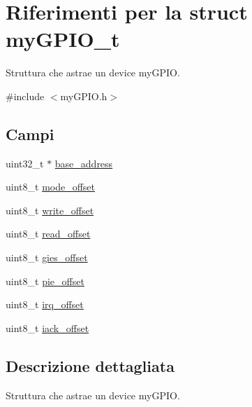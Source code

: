 \hypertarget{structmy_g_p_i_o__t}{}\section{Riferimenti per la struct my\+G\+P\+I\+O\+\_\+t}
\label{structmy_g_p_i_o__t}


Struttura che astrae un device my\+G\+P\+IO.  




{\ttfamily \#include $<$my\+G\+P\+I\+O.\+h$>$}

\subsection*{Campi}
\begin{DoxyCompactItemize}
\item 
uint32\+\_\+t $\ast$ \hyperlink{structmy_g_p_i_o__t_a79c591d5fa42efdf86abd98347fece90}{base\+\_\+address}
\item 
uint8\+\_\+t \hyperlink{structmy_g_p_i_o__t_ad21272e5293d7c1e7ccafe35a2e129d1}{mode\+\_\+offset}
\item 
uint8\+\_\+t \hyperlink{structmy_g_p_i_o__t_abb65e5db6d4ad365a7c48d00e4af1f78}{write\+\_\+offset}
\item 
uint8\+\_\+t \hyperlink{structmy_g_p_i_o__t_ab65acde67dc46f1d163e2ee468420b48}{read\+\_\+offset}
\item 
uint8\+\_\+t \hyperlink{structmy_g_p_i_o__t_a396df54cd6cf921c00ea28779db8de42}{gies\+\_\+offset}
\item 
uint8\+\_\+t \hyperlink{structmy_g_p_i_o__t_ae5f1d610c87917b9dd6fbb5af534faf0}{pie\+\_\+offset}
\item 
uint8\+\_\+t \hyperlink{structmy_g_p_i_o__t_a75a81dd8e3333cb69aa4938d82b5e433}{irq\+\_\+offset}
\item 
uint8\+\_\+t \hyperlink{structmy_g_p_i_o__t_a89b56f53628a6e25587385a964248793}{iack\+\_\+offset}
\end{DoxyCompactItemize}


\subsection{Descrizione dettagliata}
Struttura che astrae un device my\+G\+P\+IO. 

